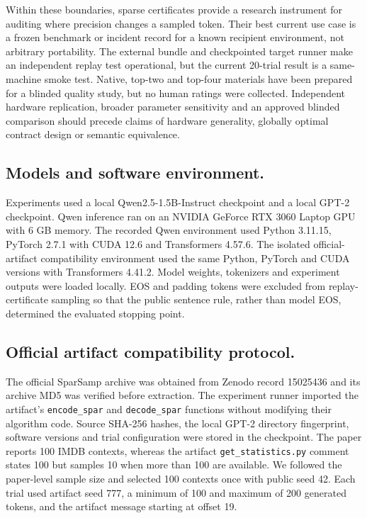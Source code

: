 \documentclass{nature}
\begin{document}
Within these boundaries, sparse certificates provide a research instrument for auditing where precision changes a sampled token. Their best current use case is a frozen benchmark or incident record for a known recipient environment, not arbitrary portability. The external bundle and checkpointed target runner make an independent replay test operational, but the current 20-trial result is a same-machine smoke test. Native, top-two and top-four materials have been prepared for a blinded quality study, but no human ratings were collected. Independent hardware replication, broader parameter sensitivity and an approved blinded comparison should precede claims of hardware generality, globally optimal contract design or semantic equivalence.

\begin{methods}

\subsection{Models and software environment.}
Experiments used a local Qwen2.5-1.5B-Instruct checkpoint \cite{ref6} and a local GPT-2 checkpoint. Qwen inference ran on an NVIDIA GeForce RTX 3060 Laptop GPU with 6 GB memory. The recorded Qwen environment used Python 3.11.15, PyTorch 2.7.1 with CUDA 12.6 and Transformers 4.57.6. The isolated official-artifact compatibility environment used the same Python, PyTorch and CUDA versions with Transformers 4.41.2. Model weights, tokenizers and experiment outputs were loaded locally. EOS and padding tokens were excluded from replay-certificate sampling so that the public sentence rule, rather than model EOS, determined the evaluated stopping point.

\subsection{Official artifact compatibility protocol.}
The official SparSamp archive was obtained from Zenodo record 15025436 and its archive MD5 was verified before extraction. The experiment runner imported the artifact's \texttt{encode\_\allowbreak{}spar} and \texttt{decode\_\allowbreak{}spar} functions without modifying their algorithm code. Source SHA-256 hashes, the local GPT-2 directory fingerprint, software versions and trial configuration were stored in the checkpoint. The paper reports 100 IMDB contexts, whereas the artifact \texttt{get\_\allowbreak{}statistics.\allowbreak{}py} comment states 100 but samples 10 when more than 100 are available. We followed the paper-level sample size and selected 100 contexts once with public seed 42. Each trial used artifact seed 777, a minimum of 100 and maximum of 200 generated tokens, and the artifact message starting at offset 19.


\end{methods}
\end{document}
